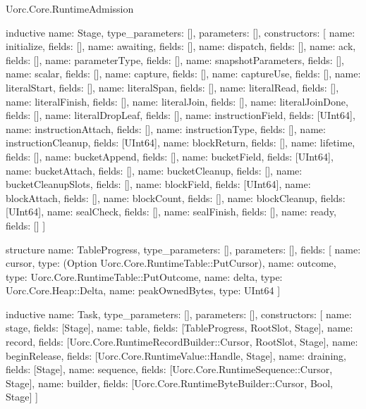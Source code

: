 \begin{lexlean}{Uorc.Core.RuntimeAdmission}
\begin{semanticmodule}
inductive{
  name: Stage,
  type_parameters: [],
  parameters: [],
  constructors: [
    {name: initialize, fields: []},
    {name: awaiting, fields: []},
    {name: dispatch, fields: []},
    {name: ack, fields: []},
    {name: parameterType, fields: []},
    {name: snapshotParameters, fields: []},
    {name: scalar, fields: []},
    {name: capture, fields: []},
    {name: captureUse, fields: []},
    {name: literalStart, fields: []},
    {name: literalSpan, fields: []},
    {name: literalRead, fields: []},
    {name: literalFinish, fields: []},
    {name: literalJoin, fields: []},
    {name: literalJoinDone, fields: []},
    {name: literalDropLeaf, fields: []},
    {name: instructionField, fields: [UInt64]},
    {name: instructionAttach, fields: []},
    {name: instructionType, fields: []},
    {name: instructionCleanup, fields: [UInt64]},
    {name: blockReturn, fields: []},
    {name: lifetime, fields: []},
    {name: bucketAppend, fields: []},
    {name: bucketField, fields: [UInt64]},
    {name: bucketAttach, fields: []},
    {name: bucketCleanup, fields: []},
    {name: bucketCleanupSlots, fields: []},
    {name: blockField, fields: [UInt64]},
    {name: blockAttach, fields: []},
    {name: blockCount, fields: []},
    {name: blockCleanup, fields: [UInt64]},
    {name: sealCheck, fields: []},
    {name: sealFinish, fields: []},
    {name: ready, fields: []}
  ]
}

structure{
  name: TableProgress,
  type_parameters: [],
  parameters: [],
  fields: [
    {name: cursor, type: (Option Uorc.Core.RuntimeTable::PutCursor)},
    {name: outcome, type: Uorc.Core.RuntimeTable::PutOutcome},
    {name: delta, type: Uorc.Core.Heap::Delta},
    {name: peakOwnedBytes, type: UInt64}
  ]
}

inductive{
  name: Task,
  type_parameters: [],
  parameters: [],
  constructors: [
    {name: stage, fields: [Stage]},
    {name: table, fields: [TableProgress, RootSlot, Stage]},
    {name: record, fields: [Uorc.Core.RuntimeRecordBuilder::Cursor, RootSlot, Stage]},
    {name: beginRelease, fields: [Uorc.Core.RuntimeValue::Handle, Stage]},
    {name: draining, fields: [Stage]},
    {name: sequence, fields: [Uorc.Core.RuntimeSequence::Cursor, Stage]},
    {name: builder, fields: [Uorc.Core.RuntimeByteBuilder::Cursor, Bool, Stage]}
  ]
}


\end{semanticmodule}
\end{lexlean}
